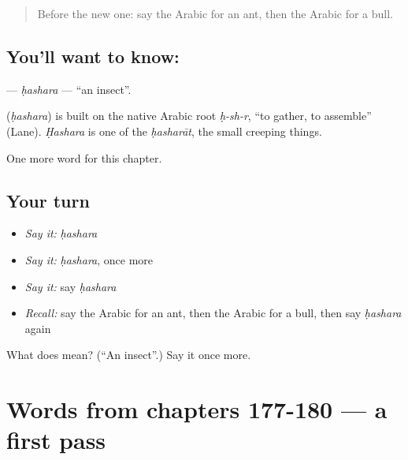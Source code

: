 \label{lesson:AR-C185-hashara}



\begin{quote}
Before the new one: say the Arabic for an ant, then the Arabic for a bull.
\end{quote}

\subsection*{You'll want to know: }
\textbf{} — \emph{ḥashara} — \textquotedblleft{}an insect\textquotedblright{}.

\begin{cousinweb}
\textbf{} (\emph{ḥashara}) is built on the native Arabic root \emph{ḥ-sh-r}, \textquotedblleft{}to gather, to assemble\textquotedblright{} (Lane). \emph{Ḥashara} is one of the \emph{ḥasharāt}, the small creeping things.
\end{cousinweb}

\begin{grammarlens}[title={What you've built}]
One more word for this chapter.
\end{grammarlens}

\subsection*{Your turn}
\begin{itemize}
\raggedright
  \item \emph{Say it:} \emph{ḥashara}
  \item \emph{Say it:} \emph{ḥashara}, once more
  \item \emph{Say it:} say \emph{ḥashara}
  \item \emph{Recall:} say the Arabic for an ant, then the Arabic for a bull, then say \emph{ḥashara} again
\end{itemize}

\begin{tcolorbox}[breakable,colback=teal!4,colframe=teal!35!black,title={Before you move on}]
What does  mean? (\textquotedblleft{}An insect\textquotedblright{}.) Say it once more.
\end{tcolorbox}
\section[(dialogue)]{Words from chapters 177-180 — a first pass}

\label{lesson:AR-R185-first-pass-words-from-chapters-177-180}



